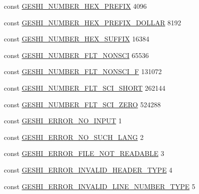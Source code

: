 \begin{DoxyCompactItemize}
const \hyperlink{geshi_8php_a7ee428a986fb6775e78f4b31829923c9}{G\-E\-S\-H\-I\-\_\-\-N\-U\-M\-B\-E\-R\-\_\-\-H\-E\-X\-\_\-\-P\-R\-E\-F\-I\-X} 4096
\item 
const \hyperlink{geshi_8php_a8b7bf2192ca0cb217bb5cd5b1d753f5c}{G\-E\-S\-H\-I\-\_\-\-N\-U\-M\-B\-E\-R\-\_\-\-H\-E\-X\-\_\-\-P\-R\-E\-F\-I\-X\-\_\-\-D\-O\-L\-L\-A\-R} 8192
\item 
const \hyperlink{geshi_8php_a5eeeb7f820cfcfd4c6f4e8f5a97ba9a2}{G\-E\-S\-H\-I\-\_\-\-N\-U\-M\-B\-E\-R\-\_\-\-H\-E\-X\-\_\-\-S\-U\-F\-F\-I\-X} 16384
\item 
const \hyperlink{geshi_8php_a21afc55328f79867223e3ed43e80500f}{G\-E\-S\-H\-I\-\_\-\-N\-U\-M\-B\-E\-R\-\_\-\-F\-L\-T\-\_\-\-N\-O\-N\-S\-C\-I} 65536
\item 
const \hyperlink{geshi_8php_a3440420334947a07e80ae297abb35a7a}{G\-E\-S\-H\-I\-\_\-\-N\-U\-M\-B\-E\-R\-\_\-\-F\-L\-T\-\_\-\-N\-O\-N\-S\-C\-I\-\_\-\-F} 131072
\item 
const \hyperlink{geshi_8php_aee41e7c8932536abbd4eeca50d36505f}{G\-E\-S\-H\-I\-\_\-\-N\-U\-M\-B\-E\-R\-\_\-\-F\-L\-T\-\_\-\-S\-C\-I\-\_\-\-S\-H\-O\-R\-T} 262144
\item 
const \hyperlink{geshi_8php_ab172e320c7be8763d038e8cb7aa70b04}{G\-E\-S\-H\-I\-\_\-\-N\-U\-M\-B\-E\-R\-\_\-\-F\-L\-T\-\_\-\-S\-C\-I\-\_\-\-Z\-E\-R\-O} 524288
\item 
const \hyperlink{geshi_8php_afac1ba98f806fc7daf63745da607b670}{G\-E\-S\-H\-I\-\_\-\-E\-R\-R\-O\-R\-\_\-\-N\-O\-\_\-\-I\-N\-P\-U\-T} 1
\item 
const \hyperlink{geshi_8php_ade94b7289ca209f2232ba54fbed45d7a}{G\-E\-S\-H\-I\-\_\-\-E\-R\-R\-O\-R\-\_\-\-N\-O\-\_\-\-S\-U\-C\-H\-\_\-\-L\-A\-N\-G} 2
\item 
const \hyperlink{geshi_8php_ab26c550d73280280d4cad465b245102f}{G\-E\-S\-H\-I\-\_\-\-E\-R\-R\-O\-R\-\_\-\-F\-I\-L\-E\-\_\-\-N\-O\-T\-\_\-\-R\-E\-A\-D\-A\-B\-L\-E} 3
\item 
const \hyperlink{geshi_8php_a532ae6b6ae831f9d4a53dd325eafb799}{G\-E\-S\-H\-I\-\_\-\-E\-R\-R\-O\-R\-\_\-\-I\-N\-V\-A\-L\-I\-D\-\_\-\-H\-E\-A\-D\-E\-R\-\_\-\-T\-Y\-P\-E} 4
\item 
const \hyperlink{geshi_8php_ade87771c2127b62786b36d1c206d5eac}{G\-E\-S\-H\-I\-\_\-\-E\-R\-R\-O\-R\-\_\-\-I\-N\-V\-A\-L\-I\-D\-\_\-\-L\-I\-N\-E\-\_\-\-N\-U\-M\-B\-E\-R\-\_\-\-T\-Y\-P\-E} 5
\end{DoxyCompactItemize}


